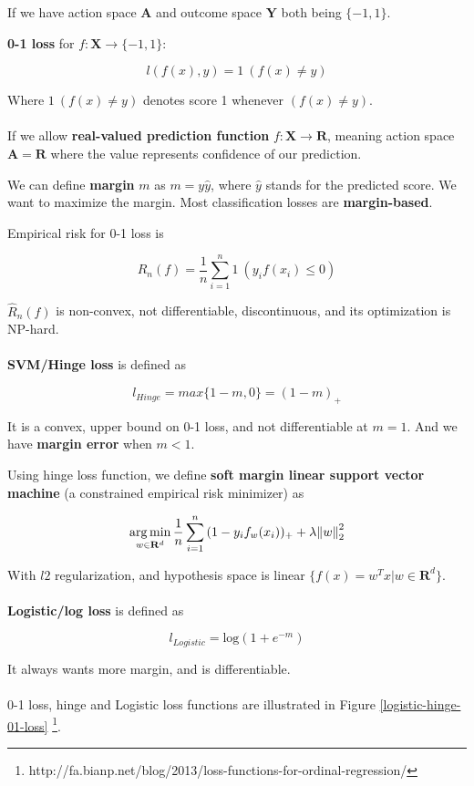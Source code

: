 \documentclass{article}
\DeclareMathOperator*{\argmin}{arg\,min}
\begin{document}
If we have action space $\mathbf{A}$ and outcome space $\mathbf{Y}$ both being $\{-1, 1\}$.

\textbf{0-1 loss} for $f: \mathbf{X} \to \{-1, 1\}$:

$$
\mathit{l}(f(x), y) = 1 ~ (f(x) \neq y)
$$

Where $1 ~ (f(x) \neq y)$ denotes score 1 whenever $(f(x) \neq y)$.
\\
\\
If we allow \textbf{real-valued prediction function} $f : \mathbf{X} \to \mathbf{R}$, meaning action space $\mathbf{A} = \mathbf{R}$ where the value represents confidence of our prediction.

We can define \textbf{margin} $m$ as $m = y \hat{y}$, where $\hat{y}$ stands for the predicted score.
We want to maximize the margin.
Most classification losses are \textbf{margin-based}.

Empirical risk for 0-1 loss is

$$
\hat{R}_n(f) = \frac{1}{n} \sum_{i = 1}^{n}{1}~(y_i f(x_i) \leq 0)
$$

$\hat{R}_n(f)$ is non-convex, not differentiable, discontinuous, and its optimization is NP-hard.
\\
\\
\textbf{SVM/Hinge loss} is defined as

$$
\mathit{l}_{Hinge} = max\{ 1 - m, 0 \} = (1 - m)_+
$$

It is a convex, upper bound on 0-1 loss, and not differentiable at $m = 1$.
And we have \textbf{margin error} when $m < 1$.

Using hinge loss function, we define \textbf{soft margin linear support vector machine} (a constrained empirical risk minimizer) as

$$
\argmin_{w \in \mathbf{R}^{d}}{\frac{1}{n} \sum_{i = 1}^{n}{(1 - y_i f_w (x_i))_+} + \lambda \norm{w}_2^2}
$$

With $l2$ regularization, and hypothesis space is linear $\{f(x) = w^{T} x | w \in \mathbf{R}^d\}$.
\\
\\
\textbf{Logistic/log loss} is defined as 

$$
\mathit{l}_{Logistic} = \text{log}(1 + e^{-m})
$$

It always wants more margin, and is differentiable.
\\
\\
0-1 loss, hinge and Logistic loss functions are illustrated in Figure \ref{logistic-hinge-01-loss} \footnote{http://fa.bianp.net/blog/2013/loss-functions-for-ordinal-regression/}.
\end{document}
